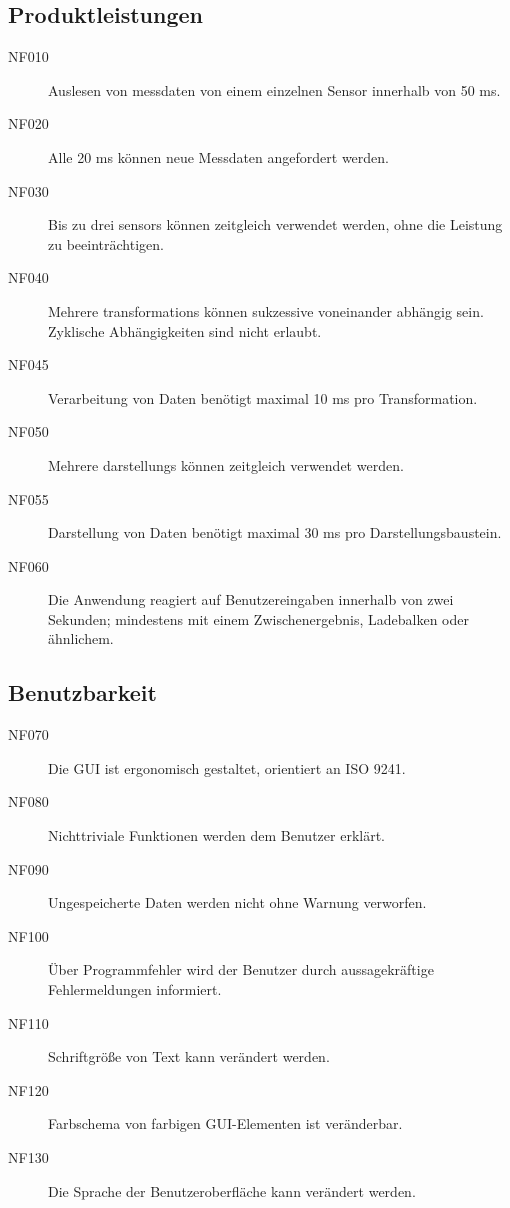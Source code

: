 \documentclass[parskip=full]{scrartcl}
\begin{document}
\subsection{Produktleistungen}

\begin{description}

\item[NF010] Auslesen von \gls{messdaten} von einem einzelnen Sensor innerhalb von 50 ms.
\item[NF020] Alle 20 ms können neue Messdaten angefordert werden.
\item[NF030] Bis zu drei \glspl{sensor} können zeitgleich verwendet werden, ohne die Leistung zu beeinträchtigen.
\item[NF040] Mehrere \glspl{transformation} können sukzessive voneinander abhängig sein. Zyklische Abhängigkeiten sind nicht erlaubt.
\item[NF045] Verarbeitung von Daten benötigt maximal 10 ms pro Transformation.
\item[NF050] Mehrere \glspl{darstellung} können zeitgleich verwendet werden.
\item[NF055] Darstellung von Daten benötigt maximal 30 ms pro Darstellungsbaustein.
\item[NF060] Die Anwendung reagiert auf Benutzereingaben innerhalb von zwei Sekunden; mindestens mit einem Zwischenergebnis, Ladebalken oder ähnlichem.

\end{description}

\subsection{Benutzbarkeit}

\begin{description}

\item[NF070] Die \gls{GUI} ist ergonomisch gestaltet, orientiert an ISO 9241.
\item[NF080] Nichttriviale Funktionen werden dem Benutzer erklärt.
\item[NF090] Ungespeicherte Daten werden nicht ohne Warnung verworfen.
\item[NF100] Über Programmfehler wird der Benutzer durch aussagekräftige Fehlermeldungen informiert.
\item[NF110] Schriftgröße von Text kann verändert werden.
\item[NF120] Farbschema von farbigen GUI-Elementen ist veränderbar.
\item[NF130] Die Sprache der Benutzeroberfläche kann verändert werden.

\end{description}
\end{document}
